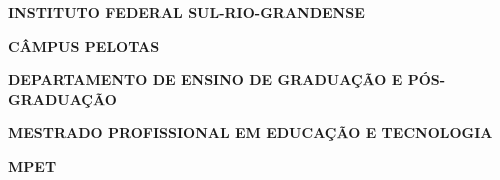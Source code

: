 
\frenchspacing 

\newpage

\pretextual


\begin{capa}
\center
\vspace*{15cm}

\makebox[\textwidth][c]{\ABNTEXchapterfont\bfseries\large\MakeTextUppercase\imprimirtitulo\hspace{1cm}}\vspace{2cm}

\makebox[\textwidth][c]{\ABNTEXchapterfont\bfseries\large\MakeTextUppercase\imprimirautor\hspace{1cm}}\vspace{3cm}

\makebox[\textwidth][c]{\bfseries\large{\imprimirdata}\hspace{1cm}}
\end{capa}



\begin{capa} 
   \center
    \normalsize{
    \bfseries\large{INSTITUTO FEDERAL SUL-RIO-GRANDENSE}
    \par
    \bfseries{CÂMPUS PELOTAS}
    \par
    \bfseries{DEPARTAMENTO DE ENSINO DE GRADUAÇÃO E PÓS-GRADUAÇÃO}
    \par
    \bfseries{MESTRADO PROFISSIONAL EM EDUCAÇÃO E TECNOLOGIA}
    \par
    \bfseries{MPET}
    }  
   \vfill
   \ABNTEXchapterfont\large\bfseries\textsc{\MakeUppercase{\imprimirautor}}
   \vfill
   \begin{center}
   \ABNTEXchapterfont\Large\bfseries{\MakeUppercase{\imprimirtitulo}}
   \end{center}
   \vfill
   \vspace*{5cm}
   \large\bfseries\MakeTextUppercase{\imprimirlocal} \\
   \large\bfseries\imprimirdata
   \vspace*{1cm}
\end{capa}

